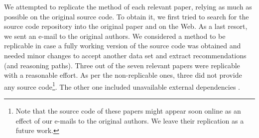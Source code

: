 \documentclass[runningheads]{llncs}
\begin{document}
We attempted to replicate the method of each relevant paper, relying as much as possible on the original source code.
To obtain it, we first tried to search for the source code repository into the original paper and on the Web.
As a last resort, we sent an e-mail to the original authors. 
We considered a method to be replicable in case a fully working version of the source code was obtained 
and needed minor changes to accept another data set and extract recommendations (and reasoning paths). 
Three out of the seven relevant papers were replicable with a reasonable effort. 
As per the non-replicable ones, three did not provide any source code\footnote{
Note that the source code of these papers might appear soon online as an effect of our e-mails to the original authors. We leave their replication as a future work.  
}. The other one included unavailable external dependencies \cite{10.1162/dint_a_00013}. 
\end{document}
